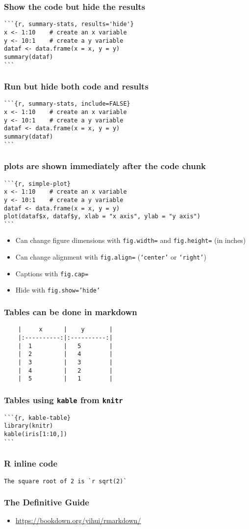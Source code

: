 \documentclass{beamer}
\newcommand{\bi}{\begin{itemize}}
\newcommand{\li}{\item}
\newcommand{\ei}{\end{itemize}}
\newcommand{\bfr}[1]{\begin{frame}[fragile]\frametitle{{ #1 }}}
\begin{document}
\bfr{Show the code but hide the results}
\begin{verbatim}
```{r, summary-stats, results='hide'}
x <- 1:10    # create an x variable
y <- 10:1    # create a y variable
dataf <- data.frame(x = x, y = y)
summary(dataf)
```
\end{verbatim}
\end{frame}
\bfr{Run but hide both code and results}
\begin{verbatim}
```{r, summary-stats, include=FALSE}
x <- 1:10    # create an x variable
y <- 10:1    # create a y variable
dataf <- data.frame(x = x, y = y)
summary(dataf)
```
\end{verbatim}
\end{frame}


\bfr{plots are shown immediately after the code chunk}
\begin{verbatim}
```{r, simple-plot}
x <- 1:10    # create an x variable
y <- 10:1    # create a y variable
dataf <- data.frame(x = x, y = y)
plot(dataf$x, dataf$y, xlab = "x axis", ylab = "y axis")
```
\end{verbatim}
\bi
\li Can change figure dimensions with {\tt fig.width=} and {\tt fig.height=} (in inches)
\li Can change alignment with {\tt fig.align=} ({\tt `center'} or {\tt `right'})
\li Captions with {\tt fig.cap=}
\li Hide with {\tt fig.show='hide'}
\ei
\end{frame}

\bfr{Tables can be done in markdown}
\begin{verbatim}
    |     x      |    y       |
    |:----------:|:----------:|
    |  1         |   5        |   
    |  2         |   4        |
    |  3         |   3        |
    |  4         |   2        |
    |  5         |   1        |
\end{verbatim}
\end{frame}

\bfr{Tables using {\tt kable} from {\tt knitr}}
\begin{verbatim}
```{r, kable-table}
library(knitr)
kable(iris[1:10,])
```
\end{verbatim}
\end{frame}

\bfr{R inline code}
\begin{verbatim}
The square root of 2 is `r sqrt(2)`
\end{verbatim}
\end{frame}

\bfr{The Definitive Guide}
\bi
\li\url{https://bookdown.org/yihui/rmarkdown/}
\ei
\end{frame}
\end{document}
